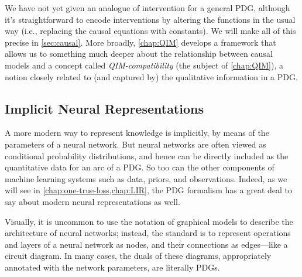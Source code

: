 We have not yet given an analogue of intervention for a general PDG, although it's straightforward to encode interventions by altering the functions in the usual way (i.e., replacing the causal equations with constants).
We will make all of this precise in \cref{sec:causal}.
More broadly, \cref{chap:QIM} develops a framework that allows us to something much deeper about the relationship between causal models and a concept called \emph{QIM-compatibility} (the subject of \cref{chap:QIM}), a notion closely related to (and captured by) the qualitative information in a PDG. 

\subsection{Implicit Neural Representations}
    \label{ssec:implicit-neural-repr}

A more modern way to represent knowledge is implicitly, by means of the parameters of a neural network. 
But neural networks are often viewed as conditional probability distributions, and hence can be directly included as the quantitative data for an arc of a PDG.
So too can the other components of machine learning systems such as data, priors, and observations. 
Indeed, as we will see in \cref{chap:one-true-loss,chap:LIR}, the PDG formalism has a great deal to say about modern neural representations as well.

Visually, it is uncommon to use the notation of graphical models to describe the architecture of neural networks; instead, the standard is to represent operations and layers of a neural network as nodes, and their connections as edges---like a circuit diagram.
In many cases, the duals of these diagrams, appropriately annotated with the network parameters, are literally PDGs.

%



